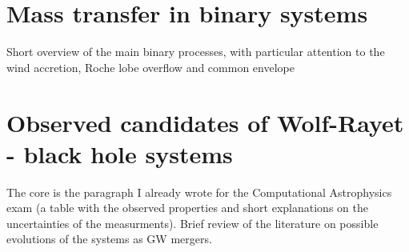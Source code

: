 \documentclass[a4paper,titlepage]{book}     	%
\begin{document}
\section{Mass transfer in binary systems}
Short overview of the main binary processes, with particular attention to the wind accretion, Roche lobe overflow and common envelope


\section{Observed candidates of Wolf-Rayet - black hole systems}
The core is the paragraph I already wrote for the Computational Astrophysics exam (a table with the observed properties and short explanations on the uncertainties of the measurments). Brief review of the literature on possible evolutions of the systems as GW mergers.\\
\end{document}
